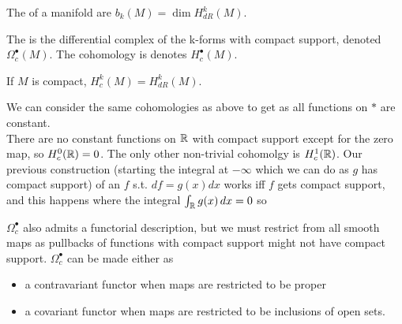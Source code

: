 \documentclass{article}
\begin{document}
\begin{definition}
	The  of a manifold are $b_k(M) = \dim H_{dR}^k(M)$. 
\end{definition}

\begin{definition}
	The  is the differential complex of the k-forms with compact support, denoted $\Omega_c^\bullet(M)$. The cohomology is denotes $H_c^\bullet(M)$.
\end{definition}

\begin{prop}
	If $M$ is compact, $H_c^k(M) = H_{dR}^k(M)$.
\end{prop}

\begin{example}
	We can consider the same cohomologies as above to get 
	as all functions on $\ast$ are constant. \\
	There are no constant functions on $\mathbb{R}$ with compact support except for the zero map, so $H^0_c(\mathbb{R})=0$. The only other non-trivial cohomolgy is $H^1_c(\mathbb{R})$. Our previous construction (starting the integral at $-\infty$ which we can do as $g$ has compact support) of an $f$ s.t. $df = g(x)dx$ works iff $f$ gets compact support, and this happens where the integral $\int_{\mathbb{R}} g(x) \, dx = 0$ so 
\end{example}

\begin{remark}
	$\Omega_c^\bullet$ also admits a functorial description, but we must restrict from all smooth maps as pullbacks of functions with compact support might not have compact support. $\Omega_c^\bullet$ can be made either as 
	\begin{itemize}
		\item a contravariant functor when maps are restricted to be proper
		\item a covariant functor when maps are restricted to be inclusions of open sets.
	\end{itemize}	
\end{remark}


\end{document}

